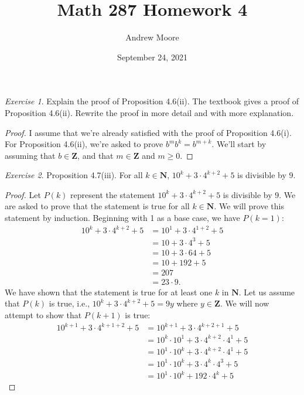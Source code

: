 \documentclass[12pt,oneside]{amsart}
\title{Math 287 Homework 4}
\author{Andrew Moore}
\date{September 24, 2021} %
\theoremstyle{remark}
\newtheorem{exer}{Exercise}
\newcommand{\bfN}{\mathbf{N}}
\newcommand{\bfZ}{\mathbf{Z}}
\begin{document}
\maketitle

%
%
%
%

\newpage
\begin{exer}
Explain the proof of Proposition 4.6(ii). The textbook gives a proof of Proposition 4.6(ii). Rewrite the proof in more detail and with more explanation.
\end{exer}

\begin{proof}
I assume that we're already satisfied with the proof of Proposition 4.6(i). For Proposition 4.6(ii), we're asked to prove $b^mb^k = b^{m + k}$. We'll start by assuming that $b \in \bfZ$, and that $m \in \bfZ$ and $m \geq 0$.
\end{proof}

%
%
%
%

\newpage
\begin{exer}
Proposition 4.7(iii). For all $k \in \bfN$, $10^k + 3 \cdot 4^{k+2} + 5$ is divisible by $9$.
\end{exer}

\begin{proof}
Let $P(k)$ represent the statement $10^k + 3 \cdot 4^{k+2} + 5$ is divisible by $9$. We are asked to prove that the statement is true for all $k \in \bfN$.  We will prove this statement by induction. Beginning with 1 as a base case, we have $P(k = 1)$:
\begin{align*}
10^k + 3 \cdot 4^{k+2} + 5 &= 10^1 + 3 \cdot 4^{1 + 2} + 5 \\
                           &= 10 + 3 \cdot 4^3 + 5 \\
                           &= 10 + 3 \cdot 64 + 5 \\
                           &= 10 + 192 + 5 \\
                           &= 207 \\
                           &= 23 \cdot 9.
\end{align*}
We have shown that the statement is true for at least one $k$ in $\bfN$. Let us assume that $P(k)$ is true, i.e., $10^k + 3 \cdot 4^{k+2} + 5 = 9y$ where $y \in \bfZ$. We will now attempt to show that $P(k + 1)$ is true:
\begin{align*}
10^{k + 1} + 3 \cdot 4^{k + 1 + 2} + 5 &= 10^{k + 1} + 3 \cdot 4^{k + 2 + 1} + 5 \\
                                       &= 10^k \cdot 10^1 + 3 \cdot 4^{k + 2} \cdot 4^1 + 5 \\
                                       &= 10^1 \cdot 10^k + 3 \cdot 4^{k + 2} \cdot 4^1 + 5 \\
                                       &= 10^1 \cdot 10^k + 3 \cdot 4^k \cdot 4^3 + 5 \\
                                       &= 10^1 \cdot 10^k + 192 \cdot 4^k + 5
\end{align*}

\end{proof}
\end{document}
